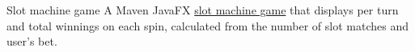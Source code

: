 {Slot machine game}
{}
{A Maven JavaFX \href{https://github.com/jacobarchambault/slotmachine}{slot machine game} that displays per turn and total winnings on each spin, calculated from the number of slot matches and user's bet.}
